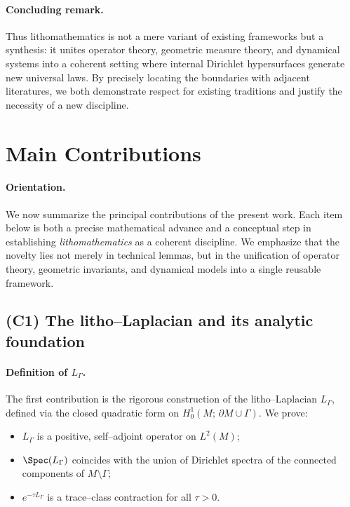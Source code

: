 \paragraph{Concluding remark.}
Thus lithomathematics is not a mere variant of existing frameworks but a synthesis: 
it unites operator theory, geometric measure theory, and dynamical systems 
into a coherent setting where internal Dirichlet hypersurfaces generate new universal laws. 
By precisely locating the boundaries with adjacent literatures, 
we both demonstrate respect for existing traditions and justify the necessity of a new discipline. 


\section{Main Contributions}\label{sec:main-contrib}

\paragraph{Orientation.}
We now summarize the principal contributions of the present work.
Each item below is both a precise mathematical advance and a conceptual step 
in establishing \emph{lithomathematics} as a coherent discipline. 
We emphasize that the novelty lies not merely in technical lemmas, 
but in the unification of operator theory, geometric invariants, and dynamical models 
into a single reusable framework.

\subsection{(C1) The litho–Laplacian and its analytic foundation}

\paragraph{Definition of $L_\Gamma$.}
The first contribution is the rigorous construction of the litho–Laplacian $L_\Gamma$, 
defined via the closed quadratic form on $H^1_0(M;\,\partial M\cup\Gamma)$. 
We prove:
\begin{itemize}
  \item $L_\Gamma$ is a positive, self–adjoint operator on $L^2(M)$;
  \item $\Spec(L_\Gamma)$ coincides with the union of Dirichlet spectra of the connected components of $M\setminus \Gamma$;
  \item $e^{-\tau L_\Gamma}$ is a trace–class contraction for all $\tau>0$.
\end{itemize}

